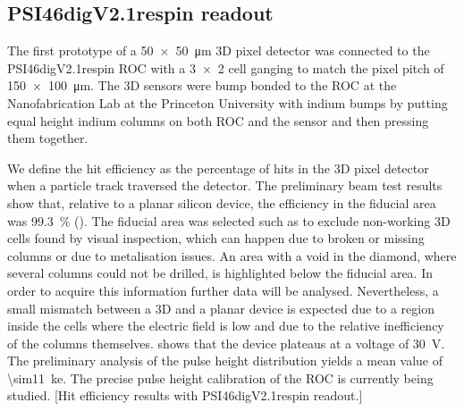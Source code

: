 \subsection{PSI46digV2.1respin readout}
The first prototype of a \SI{50x50}{\micro\meter} 3D pixel detector was connected to the PSI46digV2.1respin \ac{ROC} \cite{kornmayer} with a \SI{3x2}{} cell ganging to match the pixel pitch of \SI{150x100}{\micro\meter}. The 3D sensors were bump bonded to the \ac{ROC} at the Nanofabrication Lab at the Princeton University with indium bumps by putting equal height indium columns on both \ac{ROC} and the sensor and then pressing them together.\par
We define the hit efficiency as the percentage of hits in the 3D pixel detector when a particle track traversed the detector. The preliminary beam test results show that, relative to a planar silicon device, the efficiency in the fiducial area was \SI{99.3}{\%} (). The fiducial area was selected such as to exclude non-working 3D cells found by visual inspection, which can happen due to broken or missing columns or due to metalisation issues. An area with a void in the diamond, where several columns could not be drilled, is highlighted below the fiducial area. In order to acquire this information further data will be analysed. Nevertheless, a small mismatch between a 3D and a planar device is expected due to a region inside the cells where the electric field is low \cite{guilio} and due to the relative inefficiency of the columns themselves.  shows that the device plateaus at a voltage of \SI{30}{\volt}. The preliminary analysis of the pulse height distribution yields a mean value of \SI{\sim11}{\kilo e}. The precise pulse height calibration of the \ac{ROC} is currently being studied.
[Hit efficiency results with PSI46digV2.1respin readout.]
